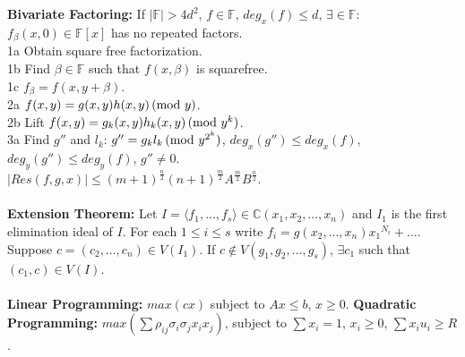 \\
\\
{\bf Bivariate Factoring:}  If $|{\mathbb F}|>4d^2$, $f \in {\mathbb F}$, 
$deg_x(f) \leq d$, $\exists \in {\mathbb F}$: $f_{\beta}(x,0) \in {\mathbb F}[x]$
has no repeated factors.\\
\jt 1a Obtain square free factorization.\\
\jt 1b Find $\beta \in {\mathbb F}$ such that $f(x,\beta)$ is squarefree.\\
\jt 1c $f_{\beta}=f(x,y+\beta)$.\\
\jt 2a $f(x,y)=g(x,y)h(x,y) \thinspace \textnormal{(mod } y \textnormal{)}$.\\
\jt 2b Lift $f(x,y)=g_k(x,y)h_k(x,y) \thinspace \textnormal{(mod } y^k \textnormal{)}$.\\
\jt 3a Find $g''$ and $l_k$: $g''=g_k l_k \thinspace \textnormal{(mod } y^{2^k} \textnormal{)}$, 
$deg_x(g'') \leq deg_x(f)$,
$deg_y(g'') \leq deg_y(f)$, $g'' \ne 0$. \\
$|Res(f,g,x)| \leq  (m+1)^{\frac n 2} (n+1)^{\frac m 2} A^{\frac m 2} B^{\frac n 2}$.
\\
\\
{\bf Extension Theorem:}
Let $I= \langle f_1 ,..., f_s \rangle \in {\mathbb C}(x_1,x_2,...,x_n)$ and $I_1$
is the first elimination ideal of $I$.  For each $1 \leq i \leq s$ write
$f_i = g(x_2,...,x_n) {x_1}^{N_i} + ...$.   Suppose $c=(c_2,...,c_n) \in V(I_1)$.
If $c \notin V(g_1,g_2,...,g_s)$, $\exists c_1$ such that $(c_1,c) \in V(I)$.  
\\
\\
{\bf Linear Programming:} $max(cx)$ subject to $Ax \leq b$, $x \geq 0$.
{\bf Quadratic Programming: }
$max(\sum \rho_{ij}\sigma_i \sigma_j x_i x_j)$, subject to $\sum x_i =1$,
$x_i \geq 0$, $\sum x_i u_i \geq R$.
